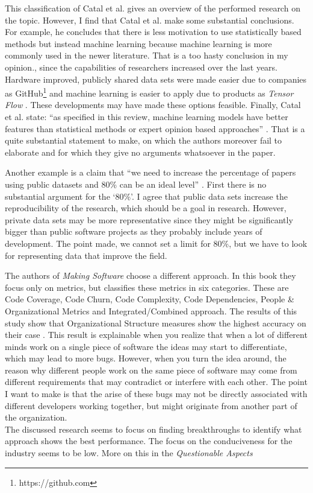 This classification of Catal et al. gives an overview of the performed research on the topic.
However, I find that Catal et al. make some substantial conclusions.
For example, he concludes that there is less motivation to use statistically based methods but instead machine learning \autocite[7350]{Catal20097346} because machine learning is more commonly used in the newer literature.
That is a too hasty conclusion in my opinion., since the capabilities of researchers increased over the last years.
Hardware improved, publicly shared data sets were made easier due to companies as GitHub\footnote{https://github.com}
and machine learning is easier to apply due to products as \textit{Tensor Flow} \autocite{abaditensorflow}.
These developments may have made these options feasible.
Finally, Catal et al. state: ``as specified in this review, machine learning models have better features than statistical methods or expert opinion based approaches'' \autocite[7351]{Catal20097346}.
That is a quite substantial statement to make, on which the authors moreover fail to elaborate and for which they give no arguments whatsoever in the paper.

Another example is a claim that ``we need to increase the percentage of papers using public datasets and 80\% can be an ideal level'' \autocite[7351]{Catal20097346}.
First there is no substantial argument for the `80\%'. I agree that public data sets increase the reproducibility of the research, which should be a goal in research.
However, private data sets may be more representative since they might be significantly bigger than public software projects as they probably include years of development.
The point made, we cannot set a limit for 80\%, but we have to look for representing data that improve the field.

The authors of \textit{Making Software} \autocite{MAKING_SOFTWARE} choose a different approach. In this book they focus only on metrics, but classifies these metrics in six categories.
These are Code Coverage, Code Churn, Code Complexity, Code Dependencies, People \& Organizational Metrics and Integrated/Combined approach.
The results of this study show that Organizational Structure measures show the highest accuracy on their case \autocite[430]{MAKING_SOFTWARE}.
This result is explainable when you realize that when a lot of different minds work on a single piece of software the ideas may start to differentiate, which may lead to more bugs.
However, when you turn the idea around, the reason why different people work on the same piece of software may come from different requirements that may contradict or interfere with each other.
The point I want to make is that the arise of these bugs may not be directly associated with different developers working together, but might originate from another part of the organization.
\\
The discussed research seems to focus on finding breakthroughs to identify what approach shows the best performance.
The focus on the conduciveness for the industry seems to be low. More on this in the \textit{Questionable Aspects}


